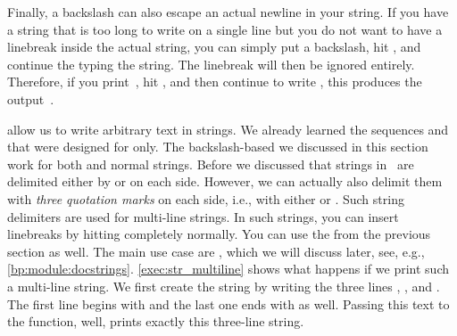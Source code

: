 Finally, a backslash can also escape an actual newline in your string.
If you have a string that is too long to write on a single line but you do not want to have a linebreak inside the actual string, you can simply put a backslash, hit \keys{\return}, and continue the typing the string.
The linebreak will then be ignored entirely.
Therefore, if you print~, hit \keys{\return}, and then continue to write , this produces the output~.

 allow us to write arbitrary text in strings.
We already learned the sequences \inQuotes{\textbraceleft\textbraceleft}\pythonIdx{\textbraceleft\textbraceleft} and \inQuotes{\textbraceright\textbraceright}\pythonIdx{\textbraceright\textbraceright} that were designed for  only.
The backslash-based  we discussed in this section work for both  and normal strings.%
%
\FloatBarrier%
\endhsection%
%
%
\label{sec:multiLineStrings}%
%
%
%
%
Before we discussed that strings in \python\ are delimited either by \pythonIdx{\textquotedbl\idxdots\textquotedbl} or \pythonIdx{\textquotesingle\idxdots\textquotesingle} on each side.
However, we can actually also delimit them with \emph{three quotation marks} on each side, i.e., with either \pythonIdx{\textquotedbl\textquotedbl\textquotedbl\idxdots\textquotedbl\textquotedbl\textquotedbl} or \pythonIdx{\textquotesingle\textquotesingle\textquotesingle\idxdots\textquotesingle\textquotesingle\textquotesingle}.
Such string delimiters are used for multi-line strings.
In such strings, you can insert linebreaks by hitting \keys{\return} completely normally.
You can use the  from the previous section as well.
The main use case are , which we will discuss later, see, e.g., \cref{bp:module:docstrings}.%
%
%
%
\cref{exec:str_multiline} shows what happens if we print such a multi-line string.
We first create the string by writing the three lines , , and .
The first line begins with \pythonIdx{\textquotedbl\textquotedbl\textquotedbl\idxdots\textquotedbl\textquotedbl\textquotedbl} and the last one ends with \pythonIdx{\textquotedbl\textquotedbl\textquotedbl\idxdots\textquotedbl\textquotedbl\textquotedbl} as well.
Passing this text to the  function, well, prints exactly this three-line string.

